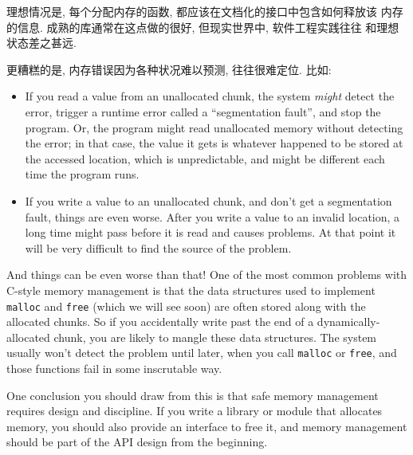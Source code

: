 \documentclass[12pt]{book}
\begin{document}
{%
理想情况是, 每个分配内存的函数, 都应该在文档化的接口中包含如何释放该
内存的信息. 成熟的库通常在这点做的很好, 但现实世界中, 软件工程实践往往
和理想状态差之甚远. 

更糟糕的是, 内存错误因为各种状况难以预测, 往往很难定位. 比如:

\begin{itemize}

\item If you read a value from an unallocated chunk, the system {\em might} detect the error, trigger a runtime error called a ``segmentation fault'', and stop the program.  Or, the program might read unallocated memory without detecting the error; in that case, the value it gets is whatever happened to be stored at the accessed location, which is unpredictable, and might be different each time the program runs.

\item If you write a value to an unallocated chunk, and don't get a segmentation fault, things are even worse.  After you write a value to an invalid location, a long time might pass before it is read and causes problems.  At that point it will be very difficult to find the source of the problem.

\end{itemize} 

And things can be even worse than that!  One of the most common
problems with C-style memory management is that the data structures
used to implement {\tt malloc} and {\tt free} (which we will see soon)
are often stored along with the allocated chunks.  So if you
accidentally write past the end of a dynamically-allocated chunk, you
are likely to mangle these data structures.  The system usually won't
detect the problem until later, when you call {\tt malloc} or
{\tt free}, and those functions fail in some inscrutable way.

One conclusion you should draw from this is that safe memory
management requires design and discipline.  If you write a library
or module that allocates memory, you should also provide an
interface to free it, and memory management should be part of
the API design from the beginning.

}
\end{document}
